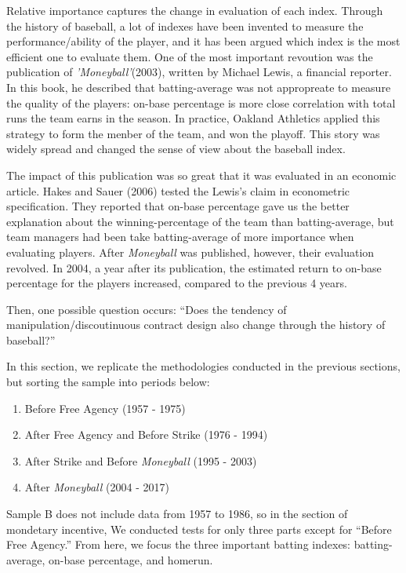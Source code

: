 \documentclass[dvipdfmx, 12pt]{article}
\begin{document}
Relative importance captures the change in evaluation of each index. Through the history of baseball, a lot of indexes have been invented to measure the performance/ability of the player, and it has been argued which index is the most efficient one to evaluate them. One of the most important revoution was the publication of \textit{'Moneyball'}(2003), written by Michael Lewis, a financial reporter. In this book, he described that batting-average was not appropreate to measure the quality of the players: on-base percentage is more close correlation with total runs the team earns in the season. In practice, Oakland Athletics applied this strategy to form the menber of the team, and won the playoff. This story was widely spread and changed the sense of view about the baseball index.

The impact of this publication was so great that it was evaluated in an economic article. Hakes and Sauer (2006) tested the Lewis's claim in econometric specification. They reported that on-base percentage gave us the better explanation about the winning-percentage of the team than batting-average, but team managers had been take batting-average of more importance when evaluating players. After \textit{Moneyball} was published, however, their evaluation revolved. In 2004, a year after its publication, the estimated return to on-base percentage for the players increased, compared to the previous 4 years.

Then, one possible question occurs: ``Does the tendency of manipulation/discoutinuous contract design also change through the history of baseball?''

In this section, we replicate the methodologies conducted in the previous sections, but sorting the sample into periods below:

\begin{enumerate}
  \item Before Free Agency (1957 - 1975)

  \item After Free Agency and Before Strike (1976 - 1994)

  \item After Strike and Before \textit{Moneyball} (1995 - 2003)

  \item After \textit{Moneyball} (2004 - 2017)
\end{enumerate}

Sample B does not include data from 1957 to 1986, so in the section of mondetary incentive, We conducted tests for only three parts except for ``Before Free Agency.'' From here, we focus the three important batting indexes: batting-average, on-base percentage, and homerun.
\end{document}
